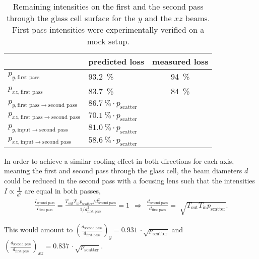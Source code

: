 \begin{table}
    \centering
    \begin{tabular}{llc}
        \toprule
        & \textbf{predicted loss} & \textbf{measured loss} \\
        \toprule
        $p_{y, \text{first pass}}$ & \SI{93.2}{\percent} & \SI{94}{\percent} \\
        $p_{xz, \text{first pass}}$ & \SI{83.7}{\percent} & \SI{84}{\percent} \\
        \midrule
        $p_{y, \text{first pass} \rightarrow \text{second pass}}$ & $\SI{86.7}{\percent} \cdot p_\text{scatter}$ & \\
        $p_{xz, \text{first pass} \rightarrow \text{second pass}}$ & $\SI{70.1}{\percent} \cdot p_\text{scatter}$ & \\
        \midrule
        $p_{y, \text{input} \rightarrow \text{second pass}}$ & $\SI{81.0}{\percent} \cdot p_\text{scatter}$ & \\
        $p_{xz, \text{input} \rightarrow \text{second pass}}$ & $\SI{58.6}{\percent} \cdot p_\text{scatter}$ & \\
        \bottomrule
    \end{tabular}
    \caption{Remaining intensities on the first and the second pass through the glass cell surface for the $y$ and the $xz$ beams. First pass intensities were experimentally verified on a mock setup.}
    \label{tab:intensity_losses}
\end{table}

In order to achieve a similar cooling effect in both directions for each axis, meaning the first and second pass through the glass cell, the beam diameters $d$ could be reduced in the second pass with a focusing lens such that the intensities $I \propto \frac{1}{d^2}$ are equal in both passes,
\begin{align}\label{eq:intensity_focusing}
\frac{I_\text{second pass}}{I_\text{first pass}} =  \frac{T_\text{out} T_\text{in} p_\text{scatter} / d^2_\text{second pass}}{1/ d^2_\text{first pass}} = 1 ~~\Rightarrow~~ \frac{d_\text{second pass}}{d_\text{first pass}} = \sqrt[]{T_\text{out} T_\text{in} p_\text{scatter}}.
\end{align}

This would amount to $\left(\frac{d_\text{second pass}}{d_\text{first pass}}\right)_y = \SI[]{0.931}{} \cdot \sqrt{p_\text{scatter}}$ and $\left(\frac{d_\text{second pass}}{d_\text{first pass}}\right)_{xz} = \SI[]{0.837}{} \cdot \sqrt{p_\text{scatter}}$.


